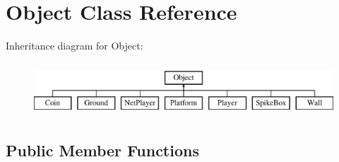 \hypertarget{class_object}{}\section{Object Class Reference}
\label{class_object}
Inheritance diagram for Object\+:\begin{figure}[H]
\begin{center}
\leavevmode
\includegraphics[height=2.000000cm]{class_object}
\end{center}
\end{figure}
\subsection*{Public Member Functions}
